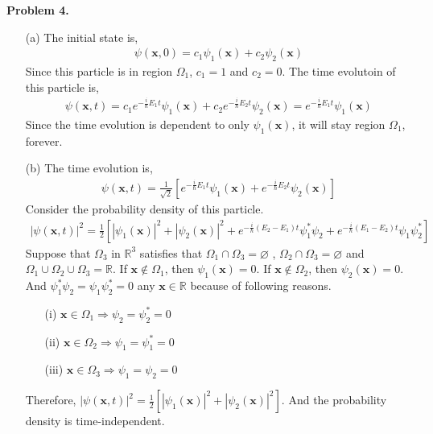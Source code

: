 \documentclass[aps,floatfix,nofootinbib,superscriptaddress,fleqn]{revtex4}
\begin{document}
\noindent \textbf{Problem 4.}
\begin{itemize}
\item[(a)] The initial state is,
  \begin{align}
    \psi(\bm{x},0) = c_1\psi_1(\bm{x})+c_2\psi_2(\bm{x})
  \end{align} 
  Since this particle is in region $\Omega_1$, $c_1=1$ and $c_2=0$. The time evolutoin of this particle is,
  \begin{align}
    \psi(\bm{x},t) = c_1e^{-\frac{i}{\hbar}E_1t}\psi_1(\bm{x})+c_2e^{-\frac{i}{\hbar}E_2t}\psi_2(\bm{x}) = e^{-\frac{i}{\hbar}E_1t}\psi_1(\bm{x})
  \end{align}
  Since the time evolution is dependent to only $\psi_1(\bm{x})$, it will stay region $\Omega_1$, forever.
\item[(b)]
  The time evolution is,
  \begin{align}
    \psi(\bm{x},t) = \frac{1}{\sqrt{2}}\left[ e^{-\frac{i}{\hbar}E_1t}\psi_1(\bm{x})+e^{-\frac{i}{\hbar}E_2t}\psi_2(\bm{x}) \right]
  \end{align}
  Consider the probability density of this particle.
  \begin{align}
    |\psi(\bm{x},t)|^2 = \frac{1}{2}\left[|\psi_1(\bm{x})|^2 + |\psi_2(\bm{x})|^2+e^{-\frac{i}{\hbar}(E_2-E_1)t}\psi_1^*\psi_2+e^{-\frac{i}{\hbar}(E_1-E_2)t}\psi_1\psi_2^*  \right]
  \end{align}
  Suppose that $\Omega_3$ in $\mathbb{R}^3 $ satisfies that $\Omega_1 \cap \Omega_3 = \varnothing$ , $\Omega_2 \cap \Omega_3 = \varnothing$ and $\Omega_1\cup \Omega_2\cup \Omega_3 = \mathbb{R}$.
  If $\bm{x}\notin\Omega_1$, then $\psi_1(\bm{x})=0$. If $\bm{x}\notin\Omega_2$, then $\psi_2(\bm{x})=0$. And $\psi_1^*\psi_2=\psi_1\psi_2^*=0$ any $\bm{x}\in \mathbb{R}$ because of following reasons.
  \begin{itemize}
    \item[(i)] $\bm{x}\in\Omega_1 \Longrightarrow \psi_2 = \psi^*_2 = 0$
    \item[(ii)] $\bm{x}\in\Omega_2 \Longrightarrow \psi_1 = \psi^*_1 = 0$
    \item[(iii)] $\bm{x}\in\Omega_3 \Longrightarrow \psi_1 = \psi_2 = 0$
  \end{itemize}
  Therefore, $|\psi(\bm{x},t)|^2 = \frac{1}{2}\left[ |\psi_1(\bm{x})|^2+|\psi_2(\bm{x})|^2 \right]$. And the probability density is time-independent.

\end{itemize}
\end{document}
